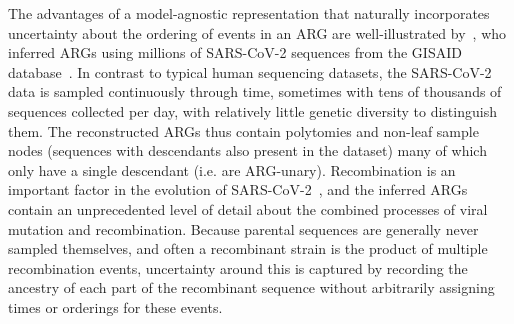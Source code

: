 \documentclass{article}
\begin{document}
The advantages of a model-agnostic representation that naturally
incorporates uncertainty about the ordering of events in an ARG
are well-illustrated by~\cite{zhan2023towards}, who
inferred ARGs using millions of SARS-CoV-2 sequences from the
GISAID database~\citep{shu2017gisaid}.
In contrast to typical human sequencing datasets, the SARS-CoV-2 data is
sampled continuously through time, sometimes with tens of thousands of sequences collected per day, with relatively little genetic diversity to
distinguish them. The reconstructed ARGs thus contain polytomies
and non-leaf sample nodes (sequences with descendants also present
in the dataset) many of which only have a single descendant (i.e. are ARG-unary).
Recombination is an important factor in the evolution of
SARS-CoV-2~\citep{vaninsberghe2021recombinant,jackson2021generation,ignatieva2022ongoing},
and the inferred ARGs contain an unprecedented level of detail about
the combined processes of viral mutation and recombination.
Because parental sequences
are generally never sampled themselves, and often
a recombinant strain is the product of multiple recombination events,
uncertainty around this is captured by recording the ancestry
of each part of the recombinant sequence without arbitrarily assigning
times or orderings for these events.
\end{document}
